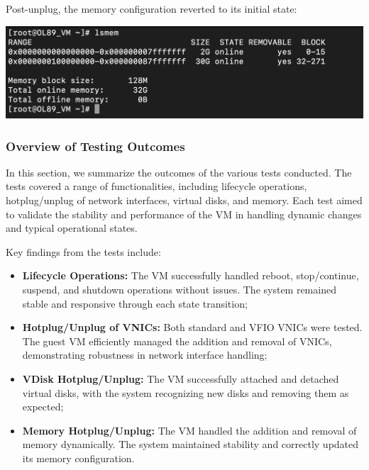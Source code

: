 Post-unplug, the memory configuration reverted to its initial state:

\begin{center}
    \centering
    \includegraphics[width=\textwidth]{Images/lsmem after unplug.png}
    \label{fig}
\end{center}



\subsubsection[Overview of Testing Outcomes]{Overview of Testing Outcomes}

In this section, we summarize the outcomes of the various tests conducted. The tests covered a range of functionalities, including lifecycle operations, hotplug/unplug of network interfaces, virtual disks, and memory. Each test aimed to validate the stability and performance of the VM in handling dynamic changes and typical operational states.\mynewline

Key findings from the tests include:

\begin{itemize}
    \item \textbf{Lifecycle Operations:} The VM successfully handled reboot, stop/continue, suspend, and shutdown operations without issues. The system remained stable and responsive through each state transition;
    \item \textbf{Hotplug/Unplug of VNICs:} Both standard and VFIO VNICs were tested. The guest VM efficiently managed the addition and removal of VNICs, demonstrating robustness in network interface handling;
    \item \textbf{VDisk Hotplug/Unplug:} The VM successfully attached and detached virtual disks, with the system recognizing new disks and removing them as expected;
    \item \textbf{Memory Hotplug/Unplug:} The VM handled the addition and removal of memory dynamically. The system maintained stability and correctly updated its memory configuration.
\end{itemize}

